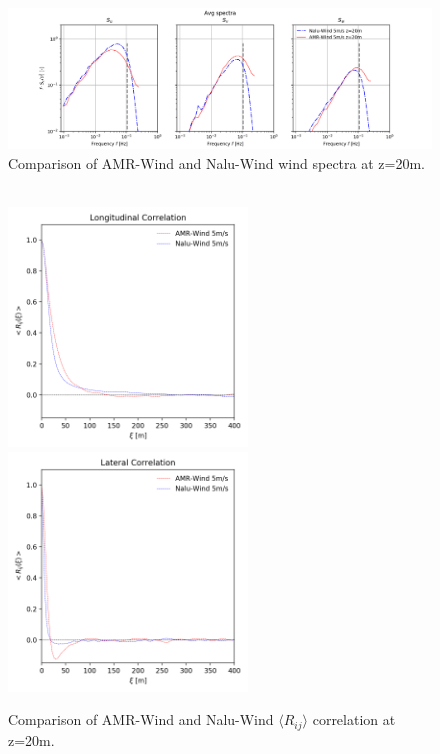 \begin{figure}[hbt!]
  \label{fig:CompareAMRvsNaluSpectra}
  \centering
  \includegraphics[width=6.0in]{figures/Compare_AMRWind_NaluWind/AMRWind_NaluWind_Spectra_Stable_z20.png}

  \caption{Comparison of AMR-Wind and Nalu-Wind wind spectra at
    z=20m. }
\end{figure}

\begin{figure}[hbt!]
  \label{fig:CompareAMRvsNaluRij}
  \centering
  \\
  \includegraphics[width=2.5in]{figures/Compare_AMRWind_NaluWind/AMRWind_NaluWind_Lengthscale_Stable_z20_Longitudinal.png}
  \includegraphics[width=2.5in]{figures/Compare_AMRWind_NaluWind/AMRWind_NaluWind_Lengthscale_Stable_z20_Lateral.png}

  \caption{Comparison of AMR-Wind and Nalu-Wind $\langle R_{ij}
    \rangle$ correlation at z=20m. }
\end{figure}

